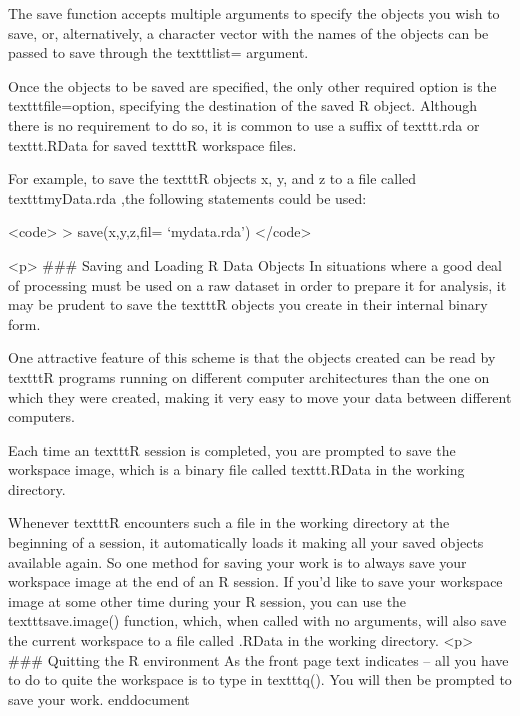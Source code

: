 The save function accepts multiple arguments to specify the objects you wish to save, or, alternatively, a character vector with the names of the objects can be passed to save through the texttt{list=} argument. 

Once the objects to be saved are specified, the only other required option is the texttt{file=option}, specifying the destination of the saved R object. Although there is no requirement to do so, it is common to use a suffix of texttt{.rda} or texttt{.RData} for saved texttt{R} workspace files.

For example, to save the texttt{R} objects x, y, and z to a file called texttt{myData.rda} ,the following statements could be used:

<code>
> save(x,y,z,fil= ‘mydata.rda’)
</code>

<p>
### {Saving and Loading R Data Objects}
In situations where a good deal of processing must be used on a raw dataset in order to prepare it for analysis, it may be prudent to save the texttt{R} objects you create in their internal binary form. 

One attractive feature of this scheme is that the objects created can be read by texttt{R} programs running on different computer architectures than the one on which they were created, making it very easy to move your data between different computers. 

Each time an texttt{R} session is completed, you are prompted to save the workspace image, which is a binary file called texttt{.RData} in the working directory. 

Whenever texttt{R} encounters such a file in the working directory at the beginning of a session, it automatically loads it making all your saved objects available again. 
So one method for saving your work is to always save your workspace image at the end of an R session. If you’d like to save your workspace image at some other time during your R session, you can use the texttt{save.image()} function, which, when called with no arguments, will also save the current workspace to a file called .RData in the working directory.
<p>
### {Quitting the R environment}
As the front page text indicates – all you have to do to quite the workspace is to type in texttt{q()}. You will then be prompted to save your work.
end{document}
